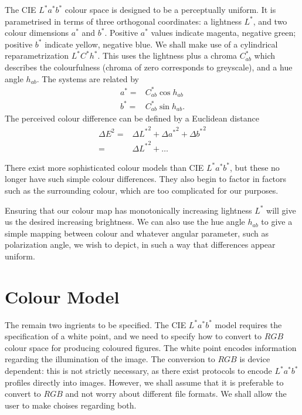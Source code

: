 \documentclass[useAMS,usedcolumn,usegraphicx,usenatbib]{mn2e}
\begin{document}
The CIE $L^\ast a^\ast b^\ast$ colour space is designed to be a perceptually uniform. It is parametrised in terms of three orthogonal coordinates: a lightness $L^\ast$, and two colour dimensions $a^\ast$ and $b^\ast$. Positive $a^\ast$ values indicate magenta, negative green; positive $b^\ast$ indicate yellow, negative blue. We shall make use of a cylindrical reparametrization $L^\ast C^\ast h^\ast$. This uses the lightness plus a chroma $C^\ast_{ab}$ which describes the colourfulness (chroma of zero corresponds to greyscale), and a hue angle $h_{ab}$. The systems are related by
\begin{align}
a^\ast = {} & C^\ast_{ab}\cos h_{ab} \\
b^\ast = {} & C^\ast_{ab}\sin h_{ab}.
\end{align}
The perceived colour difference can be defined by a Euclidean distance
\begin{align}
{\Delta E}^2 = {} & {\Delta L^\ast}^2 + {\Delta a^\ast}^2 + {\Delta b^\ast}^2 \\
 = {} &  {\Delta L^\ast}^2 + \ldots
\end{align}

There exist more sophisticated colour models than CIE $L^\ast a^\ast b^\ast$, but these no longer have such simple colour differences. They also begin to factor in factors such as the surrounding colour, which are too complicated for our purposes.

Ensuring that our colour map has monotonically increasing lightness $L^\ast$ will give us the desired increasing brightness. We can also use the hue angle $h_{ab}$ to give a simple mapping between colour and whatever angular parameter, such as polarization angle, we wish to depict, in such a way that differences appear uniform.

\section{Colour Model}

The remain two ingrients to be specified. The CIE $L^\ast a^\ast b^\ast$ model requires the specification of a white point, and we need to specify how to convert to $RGB$ colour space for producing coloured figures. The white point encodes information regarding the illumination of the image. The conversion to $RGB$ is device dependent: this is not strictly necessary, as there exist protocols to encode $L^\ast a^\ast b^\ast$ profiles directly into images. However, we shall assume that it is preferable to convert to $RGB$ and not worry about different file formats. We shall allow the user to make choises regarding both.
\end{document}

